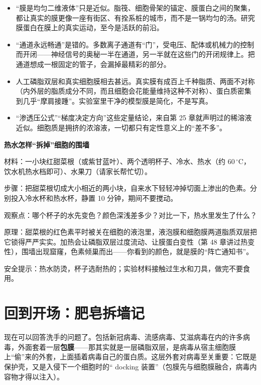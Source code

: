 \begin{itemize}[itemsep=2pt]
\item “膜是均匀二维液体”只是近似。脂筏、细胞骨架的锚定、膜蛋白之间的聚集，都让真实的膜更像一座有街区、有拴系桩的城市，而不是一锅均匀的汤。研究膜蛋白在膜上的真实运动，至今是活跃的前沿。
\item “通道永远畅通”是错的。多数离子通道有“门”，受电压、配体或机械力的控制而开闭——神经信号的奥秘一半在通道，另一半就在这些门的开闭规律上。把通道想成一根固定的管子，会漏掉最精彩的部分。
\item 人工磷脂双层和真实细胞膜相去甚远。真实膜有成百上千种脂质、两面不对称（内外层的脂质成分不同，而且细胞会花能量维持这种不对称）、蛋白质密集到几乎“摩肩接踵”。实验室里干净的模型膜是简化，不是写真。
\item “渗透压公式”“梯度决定方向”这些定量结论，来自第 25 章就声明过的稀溶液近似。细胞质是拥挤的浓溶液，一切都只有定性意义上的“差不多”。
\end{itemize}

\begin{shiyan}
\textbf{热水怎样“拆掉”细胞的围墙}

材料：一小块红甜菜根（或紫甘蓝叶）、两个透明杯子、冷水、热水（约 $60\,^{\circ}\mathrm{C}$，饮水机热水档即可）、水果刀（请家长帮忙切）。

步骤：把甜菜根切成大小相近的两小块，自来水下轻轻冲掉切面上渗出的色素。分别投入冷水杯和热水杯，静置 10 分钟，期间不要搅动。

观察点：哪个杯子的水先变色？颜色深浅差多少？对比一下，热水里发生了什么？

原理：甜菜根的红色素平时被关在细胞的液泡里，液泡膜和细胞膜两道脂质双层把它锁得严严实实。加热会让磷脂双层过度流动、让膜蛋白变性（第 48 章讲过热变性），围墙出现窟窿，色素倾巢而出——你看到的颜色，就是膜的“阵亡通知书”。

安全提示：热水防烫，杯子选耐热的；实验材料接触过生水和刀具，做完不要食用。
\end{shiyan}

\section{回到开场：肥皂拆墙记}

现在可以回答洗手的问题了。包括新冠病毒、流感病毒、艾滋病毒在内的许多病毒，外面套着一层\textbf{包膜}——那其实就是一层磷脂双层，是病毒从宿主细胞膜上“偷”来的外套，上面插着病毒自己的蛋白质。这层外套对病毒至关重要：它既是保护壳，又是入侵下一个细胞时的“ docking 装置”（包膜先与细胞膜融合，病毒内容物才得以注入）。

